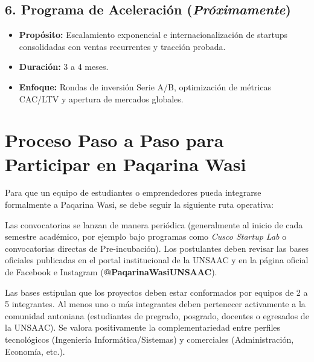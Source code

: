 ﻿\documentclass[12pt,a4paper]{article}
\begin{document}
\subsection{6. Programa de Aceleración (\textit{Próximamente})}
\begin{itemize}[leftmargin=*]
    \item \textbf{Propósito:} Escalamiento exponencial e internacionalización de startups consolidadas con ventas recurrentes y tracción probada.
    \item \textbf{Duración:} 3 a 4 meses.
    \item \textbf{Enfoque:} Rondas de inversión Serie A/B, optimización de métricas CAC/LTV y apertura de mercados globales.
\end{itemize}

\newpage
\section{Proceso Paso a Paso para Participar en Paqarina Wasi}

Para que un equipo de estudiantes o emprendedores pueda integrarse formalmente a Paqarina Wasi, se debe seguir la siguiente ruta operativa:

\begin{tcolorbox}[colback=white,colframe=boxBlue,title={\textbf{Fase 1: Convocatoria y Descarga de Bases}},fonttitle=\bfseries]
Las convocatorias se lanzan de manera periódica (generalmente al inicio de cada semestre académico, por ejemplo bajo programas como \textit{Cusco Startup Lab} o convocatorias directas de Pre-incubación). Los postulantes deben revisar las bases oficiales publicadas en el portal institucional de la UNSAAC y en la página oficial de Facebook e Instagram (\textbf{@PaqarinaWasiUNSAAC}).
\end{tcolorbox}

\begin{tcolorbox}[colback=white,colframe=boxGreen,title={\textbf{Fase 2: Conformación del Equipo Multidisciplinario}},fonttitle=\bfseries]
Las bases estipulan que los proyectos deben estar conformados por equipos de 2 a 5 integrantes. Al menos uno o más integrantes deben pertenecer activamente a la comunidad antoniana (estudiantes de pregrado, posgrado, docentes o egresados de la UNSAAC). Se valora positivamente la complementariedad entre perfiles tecnológicos (Ingeniería Informática/Sistemas) y comerciales (Administración, Economía, etc.).
\end{tcolorbox}
\end{document}
